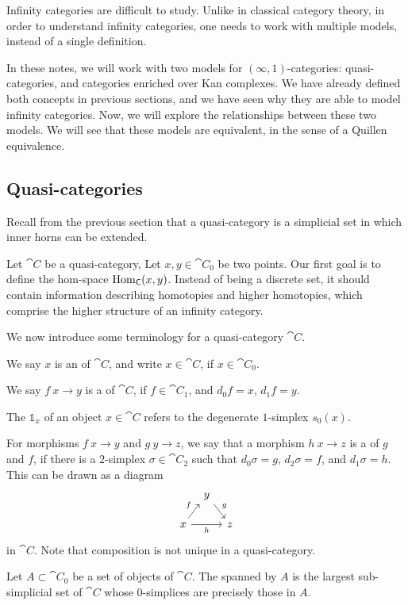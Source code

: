 Infinity categories are difficult to study.
Unlike in classical category theory,
in order to understand infinity categories,
one needs to work with multiple models, instead of a single definition.

In these notes, we will work with two models for $(\infty,1)$-categories:
quasi-categories, and categories enriched over Kan complexes.
We have already defined both concepts in previous sections,
and we have seen why they are able to model infinity categories.
Now, we will explore the relationships between these two models.
We will see that these models are equivalent,
in the sense of a Quillen equivalence.

\subsection{Quasi-categories}

Recall from the previous section that a quasi-category is a simplicial set in which
inner horns can be extended.

Let $\cat C$ be a quasi-category, 
Let $x,y\in\cat C_0$ be two points.
Our first goal is to define the hom-space $\operatorname{Hom}_{\textup{\textsf{C}}}(x,y)$.
Instead of being a discrete set, it should contain information
describing homotopies and higher homotopies, 
which comprise the higher structure of an infinity category.

We now introduce some terminology for
a quasi-category $\cat C$.
\begin{itms}
    \item We say $x$ is an  of $\cat C$, and write $x\in\cat C$, if $x\in\cat C_0$.
    \item We say $f\:x\to y$ is a  of $\cat C$, if $f\in\cat C_1$,
    and $d_0f=x$, $d_1f=y$.
    \item The  $\mathbb{1}_x$ of an object $x\in\cat C$
    refers to the degenerate $1$-simplex $s_0(x)$.
    \item For morphisms $f\:x\to y$ and $g\:y\to z$,
    we say that a morphism $h\:x\to z$
    is a  of $g$ and $f$, if 
    there is a $2$-simplex $\sigma\in\cat C_2$ such that 
    $d_0\sigma=g$, $d_2\sigma=f$, and $d_1\sigma=h$.
    This can be drawn as a diagram
    \[\begin{tikzcd}[row sep=3ex,column sep=.7em]
        & y\ar[dr,"g"] \\
        x\ar[ur,"f"]\ar[rr,"h"'] && z
    \end{tikzcd}\]
    in $\cat C$. Note that composition is not unique in a quasi-category.
    \item Let $A\subset\cat{C}_0$ be a set of objects of $\cat{C}$.
    The  spanned by $A$ is
    the largest sub-simplicial set of $\cat{C}$ whose
    $0$-simplices are precisely those in $A$.
\end{itms}

